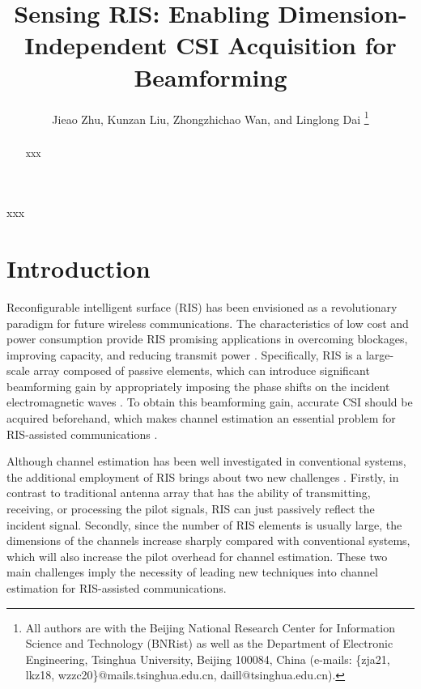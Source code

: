 \documentclass[12pt,draftclsnofoot,journal,onecolumn]{IEEEtran}
\theoremstyle{nonumberplain}
\begin{document}
\title{Sensing RIS: Enabling Dimension-Independent CSI Acquisition for Beamforming}
\author{{Jieao Zhu, Kunzan Liu, Zhongzhichao Wan, and Linglong Dai
\vspace*{-1em}}
\thanks{All authors are with the Beijing National Research Center for Information Science and Technology (BNRist) as well as the Department of Electronic Engineering, Tsinghua University, Beijing 100084, China (e-mails: \{zja21, lkz18, wzzc20\}@mails.tsinghua.edu.cn, daill@tsinghua.edu.cn).}
}

\maketitle

\begin{abstract}
xxx
\end{abstract}

\begin{IEEEkeywords}
xxx
\end{IEEEkeywords}
\section{Introduction}
Reconfigurable intelligent surface (RIS) has been envisioned as a revolutionary paradigm for future wireless communications.
The characteristics of low cost and power consumption provide RIS promising applications in overcoming blockages, improving capacity, and reducing transmit power \cite{basar2019wireless,huang2020improvingcapacity,wu2019intelligent}.
Specifically, RIS is a large-scale array composed of passive elements, which can introduce significant beamforming gain by appropriately imposing the phase shifts on the incident electromagnetic waves \cite{di2020smart}.
To obtain this beamforming gain, accurate \ac{CSI} should be acquired beforehand, which makes channel estimation an essential problem for RIS-assisted communications \cite{wei2021channel}.

Although channel estimation has been well investigated in conventional systems, the additional employment of RIS brings about two new challenges \cite{weili2021channel}.
Firstly, in contrast to traditional antenna array that has the ability of transmitting, receiving, or processing the pilot signals, RIS can just passively reflect the incident signal.
Secondly, since the number of RIS elements is usually large, the dimensions of the channels increase sharply compared with conventional systems, which will also increase the pilot overhead for channel estimation.
These two main challenges imply the necessity of leading new techniques into channel estimation for RIS-assisted communications.
\end{document}

